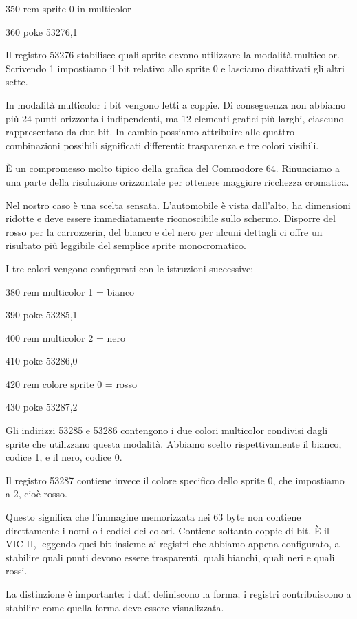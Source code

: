 \documentclass{article}
\begin{document}
350 rem sprite 0 in multicolor

360 poke 53276,1

Il registro 53276 stabilisce quali sprite devono utilizzare la modalità multicolor. Scrivendo 1 impostiamo il bit
relativo allo sprite 0 e lasciamo disattivati gli altri sette.

In modalità multicolor i bit vengono letti a coppie. Di conseguenza non abbiamo più 24 punti orizzontali indipendenti,
ma 12 elementi grafici più larghi, ciascuno rappresentato da due bit. In cambio possiamo attribuire alle quattro
combinazioni possibili significati differenti: trasparenza e tre colori visibili.

È un compromesso molto tipico della grafica del Commodore 64. Rinunciamo a una parte della risoluzione orizzontale per
ottenere maggiore ricchezza cromatica.

Nel nostro caso è una scelta sensata. L'automobile è vista dall'alto, ha dimensioni ridotte e deve essere immediatamente
riconoscibile sullo schermo. Disporre del rosso per la carrozzeria, del bianco e del nero per alcuni dettagli ci offre
un risultato più leggibile del semplice sprite monocromatico.

I tre colori vengono configurati con le istruzioni successive:

380 rem multicolor 1 = bianco

390 poke 53285,1

400 rem multicolor 2 = nero

410 poke 53286,0

420 rem colore sprite 0 = rosso

430 poke 53287,2

Gli indirizzi 53285 e 53286 contengono i due colori multicolor condivisi dagli sprite che utilizzano questa modalità.
Abbiamo scelto rispettivamente il bianco, codice 1, e il nero, codice 0.

Il registro 53287 contiene invece il colore specifico dello sprite 0, che impostiamo a 2, cioè rosso.

Questo significa che l'immagine memorizzata nei 63 byte non contiene direttamente i nomi o i codici dei colori. Contiene
soltanto coppie di bit. È il VIC-II, leggendo quei bit insieme ai registri che abbiamo appena configurato, a stabilire
quali punti devono essere trasparenti, quali bianchi, quali neri e quali rossi.

La distinzione è importante: i dati definiscono la forma; i registri contribuiscono a stabilire come quella forma deve
essere visualizzata.
\end{document}
